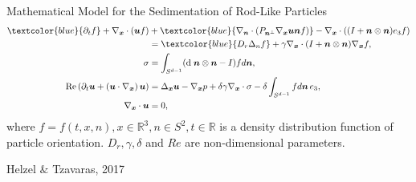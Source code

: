 \begin{frame}{Mathematical Model for the Sedimentation of Rod-Like Particles}
	\scriptsize
	\begin{align*}
		\textcolor{blue}{\partial_t f}+\nabla_{\boldsymbol{x}} \cdot(\boldsymbol{u} f) & +\textcolor{blue}{\nabla_{\boldsymbol{n}} \cdot\left(P_{\boldsymbol{n}^{\perp}} \nabla_{\boldsymbol{x}} \boldsymbol{u} \boldsymbol{n} f\right)}-\nabla_{\boldsymbol{x}} \cdot\left((I+\boldsymbol{n} \otimes \boldsymbol{n}) e_3 f\right) \\
		& =\textcolor{blue}{D_r \Delta_n f}+\gamma \nabla_{\boldsymbol{x}} \cdot(I+\boldsymbol{n} \otimes \boldsymbol{n}) \nabla_{\boldsymbol{x}} f, \notag \\
		\sigma & =\int_{S^{d-1}}(\text{d} \; \boldsymbol{n} \otimes \boldsymbol{n}-I) f d \boldsymbol{n},  \\
		\operatorname{Re}\left(\partial_t \boldsymbol{u}+\left(\boldsymbol{u} \cdot \nabla_{\boldsymbol{x}}\right) \boldsymbol{u}\right) & =\Delta_{\boldsymbol{x}} \boldsymbol{u}-\nabla_{\boldsymbol{x}} p+\delta \gamma \nabla_{\boldsymbol{x}} \cdot \sigma-\delta \int_{S^{d-1}} f d \boldsymbol{n} \, e_3, \\
		\nabla_{\boldsymbol{x}} \cdot \boldsymbol{u} & =0,
	\end{align*}
	where $f = f(t, x, n), x \in \mathbb{R}^3 , n \in  S^2, t \in \mathbb{R}$ is a density distribution function of particle orientation. $D_r, \gamma, \delta$ and $Re$ are non-dimensional parameters.
	
	\begin{beamercolorbox}[sep=1em,wd=\linewidth,right]{}
		\tiny{Helzel $\&$ Tzavaras, 2017}
	\end{beamercolorbox}
\end{frame}

